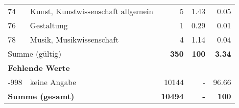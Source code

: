 \begin{longtable}{lXrrr}
        74 & \multicolumn{1}{X}{Kunst, Kunstwissenschaft allgemein} & %
          \num{5} &
          \num[round-mode=places,round-precision=2]{1,43} &
          \num[round-mode=places,round-precision=2]{0,05} \\

        76 & \multicolumn{1}{X}{Gestaltung} & %
          \num{1} &
          \num[round-mode=places,round-precision=2]{0,29} &
          \num[round-mode=places,round-precision=2]{0,01} \\

        78 & \multicolumn{1}{X}{Musik, Musikwissenschaft} & %
          \num{4} &
          \num[round-mode=places,round-precision=2]{1,14} &
          \num[round-mode=places,round-precision=2]{0,04} \\

     \midrule
     \multicolumn{2}{l}{Summe (gültig)} &
       \textbf{\num{350}} &
     \textbf{100} &
       \textbf{\num[round-mode=places,round-precision=2]{3,34}} \\
     \multicolumn{5}{l}{\textbf{Fehlende Werte}}\\
       -998 &
       keine Angabe &
         \num{10144} &
        - &
         \num[round-mode=places,round-precision=2]{96,66} \\
     \midrule
     \multicolumn{2}{l}{\textbf{Summe (gesamt)}} &
          \textbf{\num{10494}} &
        \textbf{-} &
        \textbf{100} \\
     \bottomrule
     \end{longtable}
     
